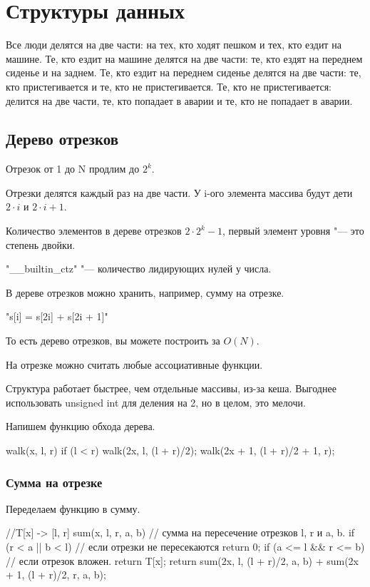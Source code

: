 \chapter{Структуры данных}

Все люди делятся на две части: на тех, кто ходят пешком 
и тех, кто ездит на машине. Те, кто ездит на машине делятся на две части: 
те, кто ездят на переднем сиденье и на заднем. Те, кто ездит на переднем сиденье 
делятся на две части: те, кто пристегивается и те, кто не пристегивается. Те, кто не 
пристегивается: делится на две части, те, кто попадает в аварии и те, кто не попадает в аварии.

\section{Дерево отрезков} 

Отрезок от 1 до N продлим до $2^k$. 

Отрезки делятся каждый раз на две части. У i-ого элемента массива будут дети $2 \cdot i$ и $2 \cdot i + 1$.

Количество элементов в дереве отрезков $2 \cdot 2^{k} - 1$, первый элемент уровня "--- это степень двойки. 

\cpp"__builtin_ctz" "--- количество лидирующих нулей у числа. 

В дереве отрезков можно хранить, например, сумму на отрезке. 

\cpp"s[i] = s[2i] + s[2i + 1]" 

То есть дерево отрезков, вы можете построить за $O(N)$. 

На отрезке можно считать любые ассоциативные функции. 

Структура работает быстрее, чем отдельные массивы, из-за кеша. 
Выгоднее использовать unsigned int для деления  на 2, но в целом, это мелочи.

Напишем функцию обхода дерева.
\begin{cppcode}
walk(x, l, r) {
    if (l < r) {
        walk(2x, l, (l + r)/2);
        walk(2x + 1, (l + r)/2 + 1, r);
    }
}
\end{cppcode}

\subsection{Сумма на отрезке}
Переделаем функцию в сумму. 

\begin{cppcode}
//T[x] -> [l, r]
sum(x, l, r, a, b) { // сумма на пересечение отрезков l, r и a, b.
    if (r < a || b < l)  { // если  отрезки не пересекаются
        return 0;
    }
    if (a <= l && r <= b) { // если отрезок вложен. 
        return T[x];
    }
    return sum(2x, l, (l + r)/2, a, b) +
    sum(2x + 1, (l + r)/2, r, a, b);
}
\end{cppcode}


